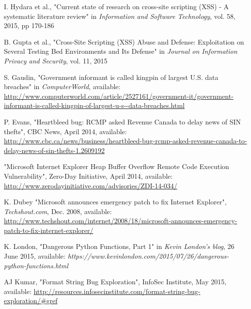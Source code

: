 \documentclass[11pt,journal]{article}
\begin{document}
\begin{thebibliography}{1}
	
	I. Hydara et al., "Current state of research on cross-site scripting (XSS) - A systematic literature review" in \emph{Information and Software Technology}, vol. 58, 2015, pp 170-186
	
	B. Gupta et al., "Cross-Site Scripting (XSS) Abuse and Defense: Exploitation on Several Testing Bed Environments and Its Defense" in \emph{Journal on Information Privacy and Security}, vol. 11, 2015
	
	S. Gaudin, "Government informant is called kingpin of largest U.S. data breaches" in \emph{ComputerWorld}, available:\\ \url{http://www.computerworld.com/article/2527161/government-it/government-informant-is-called-kingpin-of-largest-u-s--data-breaches.html}
	
	P. Evans, "Heartbleed bug: RCMP asked Revenue Canada to delay news of SIN thefts", CBC News, April 2014, available: \url{http://www.cbc.ca/news/business/heartbleed-bug-rcmp-asked-revenue-canada-to-delay-news-of-sin-thefts-1.2609192}
	
	"Microsoft Internet Explorer Heap Buffer Overflow Remote Code Execution Vulnerability", Zero-Day Initiative, April 2014, available: \url{http://www.zerodayinitiative.com/advisories/ZDI-14-034/}
	
	K. Dubey "Microsoft announces emergency patch to fix Internet Explorer", \emph{Techshout.com}, Dec. 2008, available: \url{http://www.techshout.com/internet/2008/18/microsoft-announces-emergency-patch-to-fix-internet-explorer/}
	
	\cite{Kevin London}
	K. London, "Dangerous Python Functions, Part 1" in \emph{Kevin London's blog}, 26 June 2015, available: \emph{https://www.kevinlondon.com/2015/07/26/dangerous-python-functions.html}
	
	AJ Kumar, "Format String Bug Exploration", InfoSec Institute, May 2015, available: \url{http://resources.infosecinstitute.com/format-string-bug-exploration/#gref}
\end{thebibliography}
	
\end{document}
